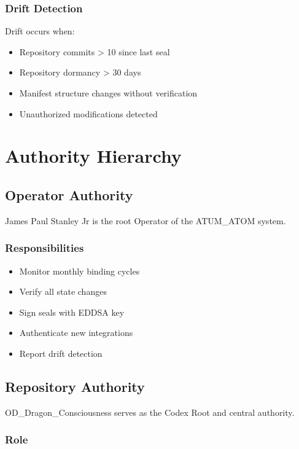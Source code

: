 \documentclass[12pt,twoside]{book}
\begin{document}
\subsection{Drift Detection}

Drift occurs when:
\begin{itemize}
  \item Repository commits > 10 since last seal
  \item Repository dormancy > 30 days
  \item Manifest structure changes without verification
  \item Unauthorized modifications detected
\end{itemize}


\chapter{Authority Hierarchy}

\section{Operator Authority}

James Paul Stanley Jr is the root Operator of the ATUM\_ATOM system.

\subsection{Responsibilities}

\begin{itemize}
  \item Monitor monthly binding cycles
  \item Verify all state changes
  \item Sign seals with EDDSA key
  \item Authenticate new integrations
  \item Report drift detection
\end{itemize}

\section{Repository Authority}

OD\_Dragon\_Consciousness serves as the Codex Root and central authority.

\subsection{Role}
\end{document}

